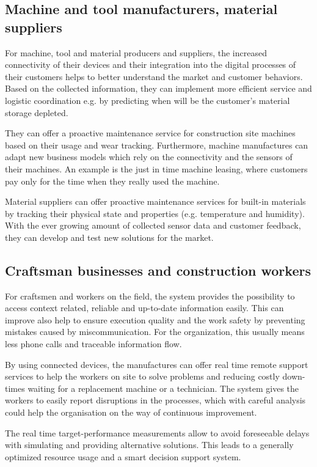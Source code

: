 \subsection{Machine and tool manufacturers, material suppliers}
For machine, tool and material producers and suppliers, the increased connectivity of their devices and their integration into the digital processes of their customers helps to better understand the market and customer behaviors. 
Based on the collected information, they can implement more efficient service and logistic coordination e.g. by predicting when will be the customer's material storage depleted.

They can offer a proactive maintenance service for construction site machines based on their usage and wear tracking. 
Furthermore, machine manufactures can adapt new business models which rely on the connectivity and the sensors of their machines. An example is the just in time machine leasing, where customers pay only for the time when they really used the machine.

Material suppliers can offer proactive maintenance services for built-in materials by tracking their physical state and properties (e.g. temperature and humidity).
With the ever growing amount of collected sensor data and customer feedback, they can develop and test new solutions for the market.


\subsection{Craftsman businesses and construction workers}
For craftsmen and workers on the field, the system provides the possibility to access context related, reliable and up-to-date information easily. 
This can improve also help to ensure execution quality and the work safety by preventing mistakes caused by miscommunication.
For the organization, this usually means less phone calls and traceable information flow.

By using connected devices, the manufactures can offer real time remote support services to help the workers on site to solve problems and reducing costly down-times waiting for a replacement machine or a technician.
The system gives the workers to easily report disruptions in the processes, which with careful analysis could help the organisation on the way of continuous improvement.

The real time target-performance measurements allow to avoid foreseeable delays with simulating and providing alternative solutions. This leads to a generally optimized resource usage and a smart decision support system.




